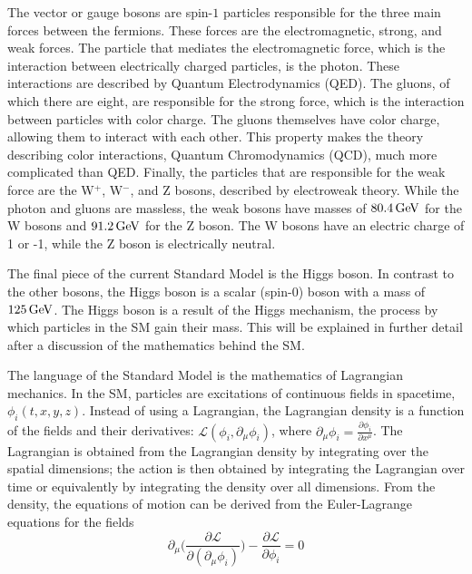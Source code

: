 

The vector or gauge bosons are spin-$1$ particles responsible for the three main forces between the fermions. These forces are the electromagnetic, strong, and weak forces. The particle that mediates the electromagnetic force, which is the interaction between electrically charged particles, is the photon. These interactions are described by Quantum Electrodynamics (QED). The gluons, of which there are eight, are responsible for the strong force, which is the interaction between particles with color charge. The gluons themselves have color charge, allowing them to interact with each other. This property makes the theory describing color interactions, Quantum Chromodynamics (QCD), much more complicated than QED. Finally, the particles that are responsible for the weak force are the W$^+$, W$^-$, and Z bosons, described by electroweak theory. While the photon and gluons are massless, the weak bosons have masses of $\GeV{80.4}$ for the W bosons and $\GeV{91.2}$ for the Z boson. The W bosons have an electric charge of 1 or -1, while the Z boson is electrically neutral.

The final piece of the current Standard Model is the Higgs boson. In contrast to the other bosons, the Higgs boson is a scalar (spin-$0$) boson with a mass of $\GeV{125}$. The Higgs boson is a result of the Higgs mechanism, the process by which particles in the SM gain their mass. This will be explained in further detail after a discussion of the mathematics behind the SM.

The language of the Standard Model is the mathematics of Lagrangian mechanics. In the SM, particles are excitations of continuous fields in spacetime, $\phi_i(t,x,y,z)$. Instead of using a Lagrangian, the Lagrangian density is a function of the fields and their derivatives: $\mathcal{L}(\phi_i, \partial_\mu\phi_i)$, where $\partial_\mu\phi_i = \frac{\partial \phi_i}{\partial x^\mu}$. The Lagrangian is obtained from the Lagrangian density by integrating over the spatial dimensions; the action is then obtained by integrating the Lagrangian over time or equivalently by integrating the density over all dimensions. From the density, the equations of motion can be derived from the Euler-Lagrange equations for the fields
\begin{equation}
    \partial_\mu\bigg(\frac{\partial\mathcal{L}}{\partial(\partial_\mu\phi_i)}\bigg)-\frac{\partial\mathcal{L}}{\partial\phi_i}=0
\end{equation}

